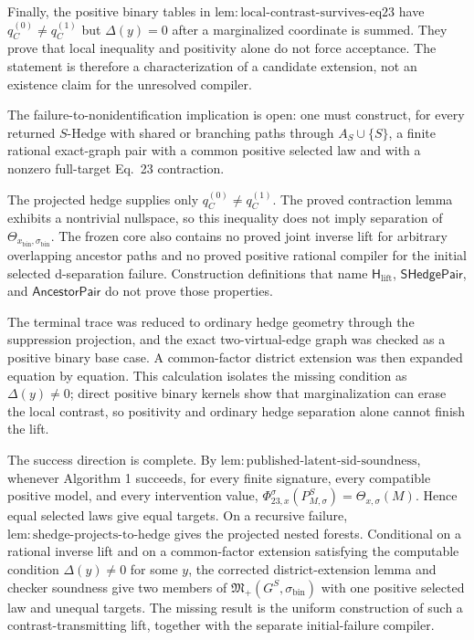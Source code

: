 {Finally, the positive binary tables in \(\mathrm{lem:local\text{-}contrast\text{-}survives\text{-}eq23}\) have \(q_C^{(0)}\ne q_C^{(1)}\) but \(\Delta(y)=0\) after a marginalized coordinate is summed.  They prove that local inequality and positivity alone do not force acceptance.  The statement is therefore a characterization of a candidate extension, not an existence claim for the unresolved compiler.

The failure-to-nonidentification implication is open: one must construct, for every returned \(S\)-Hedge with shared or branching paths through \(A_S\cup\{S\}\), a finite rational exact-graph pair with a common positive selected law and with a nonzero full-target Eq.\ 23 contraction.

The projected hedge supplies only \(q_C^{(0)}\ne q_C^{(1)}\).  The proved contraction lemma exhibits a nontrivial nullspace, so this inequality does not imply separation of \(\Theta_{x_{\mathrm{bin}},\sigma_{\mathrm{bin}}}\).  The frozen core also contains no proved joint inverse lift for arbitrary overlapping ancestor paths and no proved positive rational compiler for the initial selected d-separation failure.  Construction definitions that name \(\mathsf H_{\mathrm{lift}}\), \(\mathsf{SHedgePair}\), and \(\mathsf{AncestorPair}\) do not prove those properties.

The terminal trace was reduced to ordinary hedge geometry through the suppression projection, and the exact two-virtual-edge graph was checked as a positive binary base case.  A common-factor district extension was then expanded equation by equation.  This calculation isolates the missing condition as \(\Delta(y)\ne0\); direct positive binary kernels show that marginalization can erase the local contrast, so positivity and ordinary hedge separation alone cannot finish the lift.

The success direction is complete.  By \(\mathrm{lem:published\text{-}latent\text{-}sid\text{-}soundness}\), whenever Algorithm 1 succeeds, for every finite signature, every compatible positive model, and every intervention value, \(\Phi_{23,x}^{\sigma}(P_{M,\sigma}^S)=\Theta_{x,\sigma}(M)\).  Hence equal selected laws give equal targets.  On a recursive failure, \(\mathrm{lem:shedge\text{-}projects\text{-}to\text{-}hedge}\) gives the projected nested forests.  Conditional on a rational inverse lift and on a common-factor extension satisfying the computable condition \(\Delta(y)\ne0\) for some \(y\), the corrected district-extension lemma and checker soundness give two members of \(\mathfrak M_+(G^S,\sigma_{\mathrm{bin}})\) with one positive selected law and unequal targets.  The missing result is the uniform construction of such a contrast-transmitting lift, together with the separate initial-failure compiler.

}
